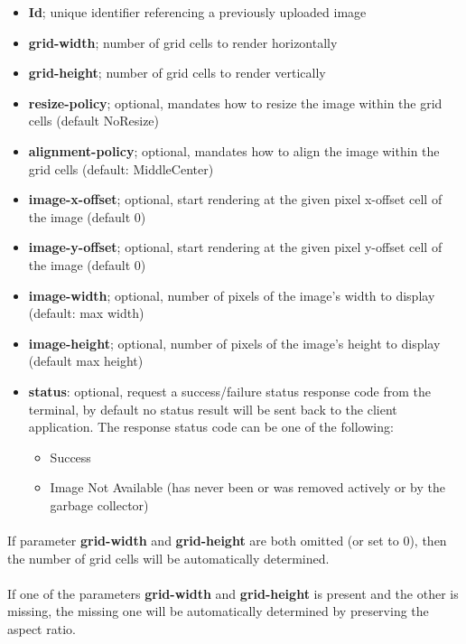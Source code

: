 \documentclass{article}
\begin{document}
\begin{itemize}
    \item \textbf{Id}; unique identifier referencing a previously uploaded image
    \item \textbf{grid-width}; number of grid cells to render horizontally
    \item \textbf{grid-height}; number of grid cells to render vertically
    \item \textbf{resize-policy}; optional, mandates how to resize the image within the grid cells (default NoResize)
    \item \textbf{alignment-policy}; optional, mandates how to align the image within the grid cells (default: MiddleCenter)
    \item \textbf{image-x-offset}; optional, start rendering at the given pixel x-offset cell of the image (default 0)
    \item \textbf{image-y-offset}; optional, start rendering at the given pixel y-offset cell of the image (default 0)
    \item \textbf{image-width}; optional, number of pixels of the image's width to display (default: max width)
    \item \textbf{image-height}; optional, number of pixels of the image's height to display (default max height)
    \item \textbf{status}: optional, request a success/failure status response code from the terminal, by default
        no status result will be sent back to the client application.
        The response status code can be one of the following:
        \begin{itemize}
            \item Success
            \item Image Not Available (has never been or was removed actively or by the garbage collector)
        \end{itemize}
\end{itemize}

\paragraph*{}
If parameter \textbf{grid-width} and \textbf{grid-height} are both omitted (or set to 0), then the
number of grid cells will be automatically determined.

\paragraph*{}
If one of the parameters \textbf{grid-width} and \textbf{grid-height} is present and the other is
missing, the missing one will be automatically determined by preserving the aspect ratio.
\end{document}
